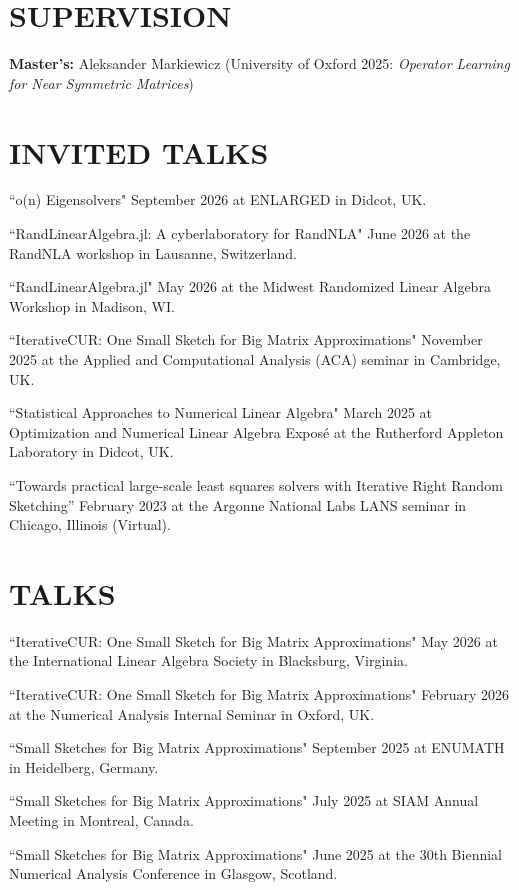 \documentclass[margin,11pt]{res}
\begin{document}
\begin{resume}
\section{SUPERVISION} 
\textbf{Master's:} Aleksander Markiewicz (University of Oxford 2025: \textit{Operator Learning for Near Symmetric Matrices}) \\

\section{INVITED TALKS}
``o(n) Eigensolvers" September 2026 at ENLARGED  in Didcot, UK.

``RandLinearAlgebra.jl: A cyberlaboratory for RandNLA" June 2026 at the RandNLA workshop in Lausanne, Switzerland.

``RandLinearAlgebra.jl" May 2026 at the Midwest Randomized Linear Algebra Workshop in Madison, WI.

``IterativeCUR: One Small Sketch for Big Matrix Approximations" November 2025 at the Applied and Computational Analysis (ACA) seminar in Cambridge, UK.

``Statistical Approaches to Numerical Linear Algebra" March 2025 at Optimization and Numerical Linear Algebra Expos\'e at the Rutherford Appleton Laboratory in Didcot, UK.

``Towards practical large-scale least squares solvers with Iterative Right Random Sketching'' February 2023 at the Argonne National Labs LANS seminar in Chicago, Illinois (Virtual).

\section{TALKS}

``IterativeCUR: One Small Sketch for Big Matrix Approximations" May 2026 at the International Linear Algebra Society in Blacksburg, Virginia.

``IterativeCUR: One Small Sketch for Big Matrix Approximations" February 2026 at the Numerical Analysis Internal Seminar in Oxford, UK.

``Small Sketches for Big Matrix Approximations" September 2025 at ENUMATH in Heidelberg, Germany.

``Small Sketches for Big Matrix Approximations" July 2025 at  SIAM Annual Meeting in Montreal, Canada.

``Small Sketches for Big Matrix Approximations" June 2025 at the 30th Biennial Numerical Analysis Conference in Glasgow, Scotland.


\end{resume}
\end{document}

